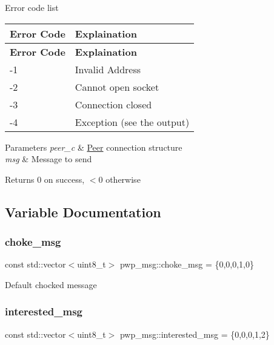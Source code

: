 Error code list

\tabulinesep=1mm
\begin{longtabu} spread 0pt [c]{*{2}{|X[-1]}|}
\hline
\rowcolor{\tableheadbgcolor}\textbf{ Error Code }&\textbf{ Explaination  }\\
\endfirsthead
\hline
\endfoot
\hline
\rowcolor{\tableheadbgcolor}\textbf{ Error Code }&\textbf{ Explaination  }\\
\endhead
-\/1 &Invalid Address \\
-\/2 &Cannot open socket \\
-\/3 &Connection closed \\
-\/4 &Exception (see the output) \\
\end{longtabu}

\begin{DoxyParams}{Parameters}
{\em peer\+\_\+c} & \hyperlink{classPeer}{Peer} connection structure \\
\hline
{\em msg} & Message to send \\
\hline
\end{DoxyParams}
\begin{DoxyReturn}{Returns}
0 on success, $<$0 otherwise 
\end{DoxyReturn}


\subsection{Variable Documentation}
\mbox{\label{namespacepwp__msg_a695ee2efb59a7c258559f19440fe6998}} 
\subsubsection{\texorpdfstring{choke\+\_\+msg}{choke\_msg}}
{\footnotesize\ttfamily const std\+::vector$<$uint8\+\_\+t$>$ pwp\+\_\+msg\+::choke\+\_\+msg = \{0,0,0,1,0\}}

Default chocked message \mbox{\label{namespacepwp__msg_afc68b17ce131c52fa0beb0cc7185778b}} 
\subsubsection{\texorpdfstring{interested\+\_\+msg}{interested\_msg}}
{\footnotesize\ttfamily const std\+::vector$<$uint8\+\_\+t$>$ pwp\+\_\+msg\+::interested\+\_\+msg = \{0,0,0,1,2\}}

